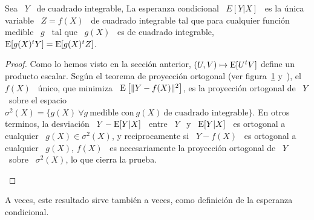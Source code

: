 \begin{corolario}
  Sea \ $Y$  \ de cuadrado integrable, La esperanza condicional  \ $E[Y|X]$ \ es
  la  \'unica variable  \  $Z =  f(X)$ \  de  cuadrado integrable  tal que  para
  cualquier  funci\'on medible  \  $g$  \ tal  que  \ $g(X)$  \  es de  cuadrado
  integrable, \ $\operatorname{E}[g(X)^tY] = \operatorname{E}[g(X)^t Z]$.
\end{corolario}
\begin{proof}
  Como  lo hemos visto  en la  secci\'on anterior,  $(U,V) \mapsto  \operatorname{E}[U^t V]$
  define un producto escalar.  Seg\'un el teorema de proyecci\'on ortogonal (ver
  figura~\ref{Fig:MP:TeoProyOrto}  y~\cite{JacPro03,   AthLah06,  toto}),  el  \
  $f(X)$ \ \'unico, que minimiza \ $\operatorname{E}\left[  \| Y - f(X) \|^2 \right]$, es la
  proyecci\'on ortogonal de \ $Y$ \ sobre el espacio \ $\sigma^2(X) = \{ g(X) \:
  \forall g \:  \mbox{medible con} \: g(X) \:  \mbox{de cuadrado integrable}\}$.
  En otros  terminos, la  desviaci\'on \ $Y  - \operatorname{E}[Y|X]$  \ entre \  $Y$ \  y \
  $\operatorname{E}[Y|X]$  \  es   ortogonal  a  cualquier  \  $g(X)   \in  \sigma^2(X)$,  y
  reciprocamente si \ $Y  - f(X)$ \ es ortogonal a cualquier  \ $g(X)$, $f(X)$ \
  es necesariamente la proyecci\'on ortogonal  de \ $Y$ \ sobre \ $\sigma^2(X)$,
  lo que cierra la prueba.
\begin{figure}[h!]
  \begin{center}          \end{center}
\label{Fig:MP:TeoProyOrto}
\end{figure}
\end{proof}
%
A  veces,  este resultado  sirve  tambi\'en a  veces,  como  definici\'on de  la
esperanza condicional.